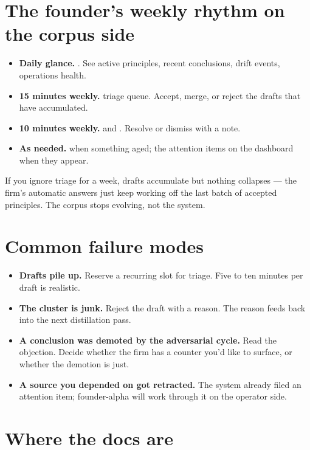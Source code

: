 \documentclass[11pt]{article}
\begin{document}
\section{The founder's weekly rhythm on the corpus side}

\begin{itemize}[leftmargin=*,itemsep=0.3em]
  \item \textbf{Daily glance.} . See active principles,
        recent conclusions, drift events, operations health.
  \item \textbf{15 minutes weekly.}  triage queue.
        Accept, merge, or reject the drafts that have accumulated.
  \item \textbf{10 minutes weekly.}  and
        . Resolve or dismiss with a note.
  \item \textbf{As needed.}  when something aged; the
        attention items on the dashboard when they appear.
\end{itemize}

If you ignore triage for a week, drafts accumulate but nothing
collapses --- the firm's automatic answers just keep working off the
last batch of accepted principles. The corpus stops evolving, not the
system.

\section{Common failure modes}

\begin{itemize}[leftmargin=*,itemsep=0.3em]
  \item \textbf{Drafts pile up.} Reserve a recurring slot for triage.
        Five to ten minutes per draft is realistic.
  \item \textbf{The cluster is junk.} Reject the draft with a reason.
        The reason feeds back into the next distillation pass.
  \item \textbf{A conclusion was demoted by the adversarial cycle.}
        Read the objection. Decide whether the firm has a counter
        you'd like to surface, or whether the demotion is just.
  \item \textbf{A source you depended on got retracted.} The system
        already filed an attention item; founder-alpha will work
        through it on the operator side.
\end{itemize}

\section{Where the docs are}
\end{document}
